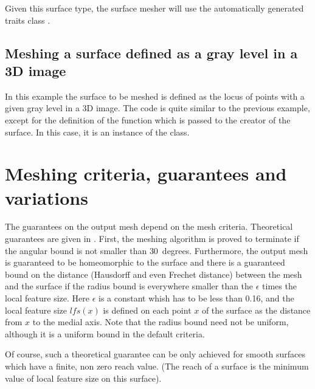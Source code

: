 Given this surface type, the surface mesher will use
the automatically generated traits class
.


\subsection{Meshing a surface defined as a gray level in a 3D image}
In this example the surface to be meshed is defined
as the locus of points with a given gray level
in a 3D image.
The code is quite similar to the previous example,
except for the definition of the function
which is passed to the creator of the surface.
In this case, it is an instance of
the  class.



\section{Meshing criteria, guarantees and variations}
\label{SurfaceMesher_section_criteria}
\label{SurfaceMesher_section_variations}

The guarantees on the output mesh depend on the mesh criteria.
Theoretical guarantees are given in \cite{cgal:bo-pgsms-05}.
First, the meshing algorithm is proved to terminate 
if the angular bound is
not smaller than $30$~degrees. 
Furthermore, the output mesh 
is guaranteed to be homeomorphic to the surface
and  there is a guaranteed bound 
on the  distance (Hausdorff and even Frechet distance)
between the mesh and the surface
if the radius bound is everywhere smaller than 
the $\epsilon$ times the local feature size. 
Here $\epsilon$ is a constant whish has to be
less than 0.16, and the local feature size 
$lfs(x)$ is defined on each point $x$ of the surface
as the distance from $x$ to the medial axis.  
Note that the radius bound need not be uniform,
although it is a uniform bound in the default criteria.

Of course, such a theoretical guarantee can be only achieved
for smooth surfaces which have a finite, non zero
reach value. (The reach of a surface is the minimum value 
of local feature size on
this surface).

